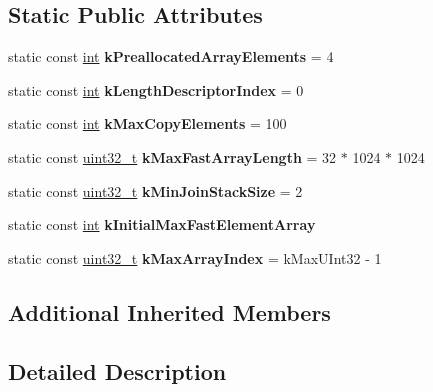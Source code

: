 \subsection*{Static Public Attributes}
\begin{DoxyCompactItemize}
\item 
\mbox{\label{classv8_1_1internal_1_1JSArray_a67bc60ae3f9c63e64f3b8cc94d718bc0}} 
static const \mbox{\hyperlink{classint}{int}} {\bfseries k\+Preallocated\+Array\+Elements} = 4
\item 
\mbox{\label{classv8_1_1internal_1_1JSArray_a8518c34fdf9fe7de0534d16e9b3965c2}} 
static const \mbox{\hyperlink{classint}{int}} {\bfseries k\+Length\+Descriptor\+Index} = 0
\item 
\mbox{\label{classv8_1_1internal_1_1JSArray_ab7f0ba556e6297fdeff589254dc77c3c}} 
static const \mbox{\hyperlink{classint}{int}} {\bfseries k\+Max\+Copy\+Elements} = 100
\item 
\mbox{\label{classv8_1_1internal_1_1JSArray_ad4a204c6582b2a18446eafa1af6b4cde}} 
static const \mbox{\hyperlink{classuint32__t}{uint32\+\_\+t}} {\bfseries k\+Max\+Fast\+Array\+Length} = 32 $\ast$ 1024 $\ast$ 1024
\item 
\mbox{\label{classv8_1_1internal_1_1JSArray_a692de1ac404ce6c228447af34ee7b8a7}} 
static const \mbox{\hyperlink{classuint32__t}{uint32\+\_\+t}} {\bfseries k\+Min\+Join\+Stack\+Size} = 2
\item 
static const \mbox{\hyperlink{classint}{int}} {\bfseries k\+Initial\+Max\+Fast\+Element\+Array}
\item 
\mbox{\label{classv8_1_1internal_1_1JSArray_a869f03db24586fc415a9736a0a76577f}} 
static const \mbox{\hyperlink{classuint32__t}{uint32\+\_\+t}} {\bfseries k\+Max\+Array\+Index} = k\+Max\+U\+Int32 -\/ 1
\end{DoxyCompactItemize}
\subsection*{Additional Inherited Members}


\subsection{Detailed Description}


